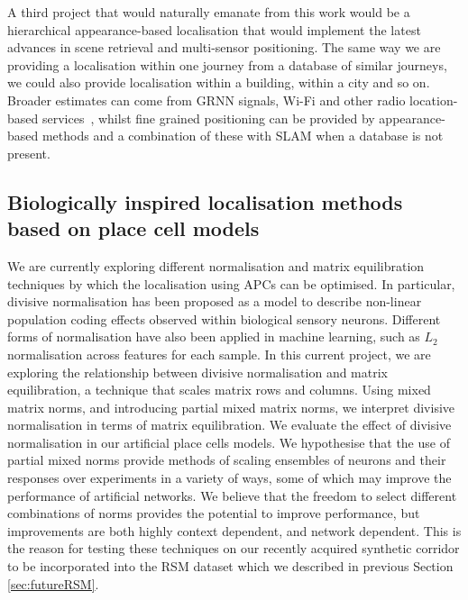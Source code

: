A third project that would naturally emanate from this work would be a hierarchical appearance-based localisation that would implement the latest advances in scene retrieval and multi-sensor positioning. The same way we are providing a localisation within one journey from a database of similar journeys, we could also provide localisation within a building, within a city and so on. Broader estimates can come from GRNN signals, Wi-Fi and other radio location-based services~\cite{wang2012no}, whilst fine grained positioning can be provided by appearance-based methods and a combination of these with SLAM when a database is not present.

\subsection{Biologically inspired localisation methods based on place cell models}

We are currently exploring different normalisation and matrix equilibration techniques by which the localisation using APCs can be optimised. In particular, divisive normalisation has been proposed as a model to describe non-linear population coding effects observed within biological sensory neurons. Different forms of normalisation have also been applied in machine learning, such as $L_2$ normalisation across features for each sample. In this current project, we are exploring the relationship between divisive normalisation and matrix equilibration, a technique that scales matrix rows and columns. Using mixed matrix norms, and introducing partial mixed matrix norms, we interpret divisive normalisation in terms of matrix equilibration. We evaluate the effect of divisive normalisation in our artificial place cells models. We hypothesise that the use of partial mixed norms provide methods of scaling ensembles of neurons and their responses over experiments in a variety of ways, some of which may improve the performance of artificial networks. We believe that the freedom to select different combinations of norms provides the potential to improve performance, but improvements are both highly context dependent, and network dependent. This is the reason for testing these techniques on our recently acquired synthetic corridor to be incorporated into the RSM dataset which we described in previous Section \ref{sec:futureRSM}.


